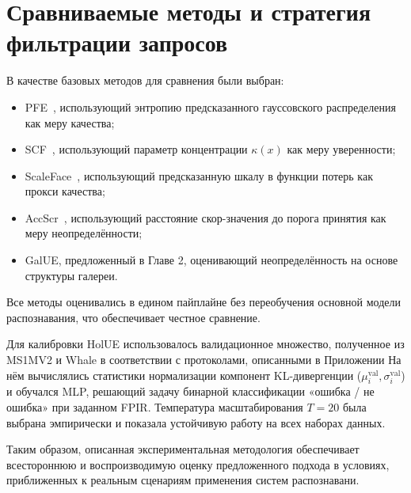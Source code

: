 \section{Сравниваемые методы и стратегия фильтрации запросов}\label{sec:experiment_setup/baselines}
В качестве базовых методов для сравнения были выбран:
\begin{itemize}  
    \item PFE~\cite{pfe}, использующий энтропию предсказанного гауссовского распределения как меру качества;  
    \item SCF~\cite{scf}, использующий параметр концентрации $\kappa(x)$ как меру уверенности;  
    \item ScaleFace~\cite{scaleface}, использующий предсказанную шкалу в функции потерь как прокси качества;  
    \item AccScr~\cite{huber2022stating}, использующий расстояние скор-значения до порога принятия как меру неопределённости;  
    \item GalUE, предложенный в Главе 2, оценивающий неопределённость на основе структуры галереи.
\end{itemize}  
Все методы оценивались в едином пайплайне без переобучения основной модели распознавания, что обеспечивает честное сравнение.

Для калибровки HolUE использовалось валидационное множество, полученное из MS1MV2 и Whale в соответствии с протоколами, описанными в Приложении  
На нём вычислялись статистики нормализации компонент KL-дивергенции ($\mu_i^{\text{val}}, \sigma_i^{\text{val}}$) и обучался MLP, решающий задачу бинарной классификации «ошибка / не ошибка» при заданном FPIR.
Температура масштабирования $T = 20$ была выбрана эмпирически и показала устойчивую работу на всех наборах данных.

Таким образом, описанная экспериментальная методология обеспечивает всестороннюю и воспроизводимую оценку предложенного подхода в условиях, приближенных к реальным сценариям применения систем распознавани.